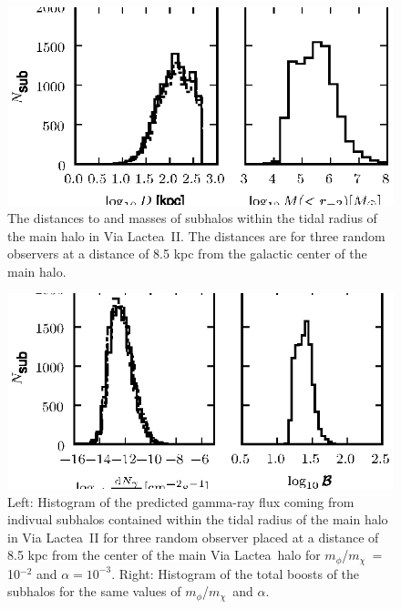 \documentclass[aps,prd,twocolumn,amsmath,amssymb,floatfix,nofootinbib,10pt]{revtex4}
\newcommand{\VL}{Via Lactea}
\newcommand{\mdm}{\ensuremath{m_{\chi}}}
\newcommand{\mv}{\ensuremath{m_{\phi}}}
\begin{document}












\begin{figure}
\centering
\includegraphics{hist_-2_-3_10_1.eps}
\caption{The distances to and masses of subhalos within the tidal
radius of the main halo in \VL\ II. The distances are for three random
observers at a distance of 8.5 kpc from the galactic center of the
main halo.}%
\label{fig:VL23_1}%
\end{figure}






\begin{figure}
\centering
\includegraphics{hist_-2_-3_10_2.eps}
\caption{Left: Histogram of the predicted gamma-ray flux coming from
indivual subhalos contained within the tidal radius of the main halo
in \VL\ II for three random observer placed at a distance of 8.5 kpc
from the center of the main \VL\ halo for \mv/\mdm\ = 10$^{-2}$ and
$\alpha = 10^{-3}$. Right: Histogram of the total boosts of the
subhalos for the same values of \mv/\mdm\ and $\alpha$.}%
\label{fig:VL23_2}%
\end{figure}
\end{document}
